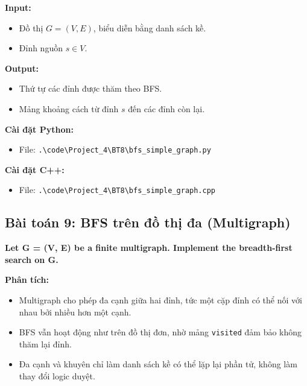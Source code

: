 \documentclass[12pt,a4paper]{article}
\begin{document}
\textbf{Input:}
\begin{itemize}[label=\textbullet]
    \item Đồ thị $ G = (V, E) $, biểu diễn bằng danh sách kề.
    \item Đỉnh nguồn $ s \in V $.
\end{itemize}

\textbf{Output:}
\begin{itemize}[label=\textbullet]
    \item Thứ tự các đỉnh được thăm theo BFS.
    \item Mảng khoảng cách từ đỉnh $ s $ đến các đỉnh còn lại.
\end{itemize}

\textbf{Cài đặt Python:}
\begin{itemize}[label=\textbullet]
   \item File: \texttt{.\textbackslash code\textbackslash Project\_4\textbackslash BT8\textbackslash bfs\_simple\_graph.py}
\end{itemize}

\textbf{Cài đặt C++:}
\begin{itemize}[label=\textbullet]
   \item File: \texttt{.\textbackslash code\textbackslash Project\_4\textbackslash BT8\textbackslash bfs\_simple\_graph.cpp}
\end{itemize}



\subsection{Bài toán 9: BFS trên đồ thị đa (Multigraph)}

\begin{problembox}
    \textbf{Let G = (V, E) be a finite multigraph. Implement the breadth-first search on G.} 
\end{problembox}

\textbf{Phân tích:}
\begin{itemize}[label=\textbullet]
    \item Multigraph cho phép đa cạnh giữa hai đỉnh, tức một cặp đỉnh có thể nối với nhau bởi nhiều hơn một cạnh.
    \item BFS vẫn hoạt động như trên đồ thị đơn, nhờ mảng \texttt{visited} đảm bảo không thăm lại đỉnh.
    \item Đa cạnh và khuyên chỉ làm danh sách kề có thể lặp lại phần tử, không làm thay đổi logic duyệt.
\end{itemize}
\end{document}
